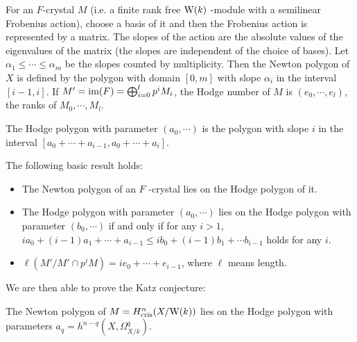 \begin{definition}
    For an $F$-crystal $M$ 
    (i.e. a finite rank free $\mathrm{W}(k)$ -module with a semilinear Frobenius action), 
    choose a basis of it and then the Frobenius action is represented by a matrix. 
    The slopes of the action are the absolute values of the eigenvalues of the matrix 
    (the slopes are independent of the choice of bases). 
    Let $\alpha_1 \leq \cdots \leq \alpha_m$ be the slopes counted by multiplicity. 
    Then the Newton polygon of $X$ is defined by the polygon with domain $[0, m]$ 
    with slope $\alpha_i$ in the interval $[i - 1, i]$. 
    If $M' = \operatorname{im}(F) = \bigoplus_{i = 0}^l p^i M_i$, 
    the Hodge number of $M$ is $(e_0, \cdots, e_l)$, 
    the ranks of $M_0, \cdots, M_l$.
\end{definition}

\begin{definition}
    The Hodge polygon with parameter $(a_0, \cdots)$ is the polygon 
    with slope $i$ in the interval $[a_0 + \cdots + a_{i-1}, a_0 + \cdots + a_i]$.
\end{definition}

\begin{lemma}
    The following basic result holds:
    \begin{itemize}
        \item 
            The Newton polygon of an $F$ -crystal lies on the Hodge polygon of it.
        \item 
            The Hodge polygon with parameter $(a_0, \cdots)$ lies on the Hodge polygon 
            with parameter $(b_0, \cdots)$ if and only if for any $i>1$, 
            $i a_0 + (i - 1) a_1 + \cdots + a_{i-1} 
            \leq i b_0 + (i - 1) b_1 + \cdots b_{i - 1}$ 
            holds for any $i$.
        \item 
            $\ell(M'/M' \cap p^i M) = i e_0 + \cdots + e_{i - 1}$, 
            where $\ell$ means length.
    \end{itemize}
\end{lemma}

We are then able to prove the Katz conjecture:
\begin{theorem}
The Newton polygon of $M = H^n_{\mathrm{cris}}(X/\mathrm{W}(k))$ lies on the Hodge polygon 
with parameters $a_q = h^{n-q}(X, \Omega_{X/k}^q)$. 
\end{theorem}

